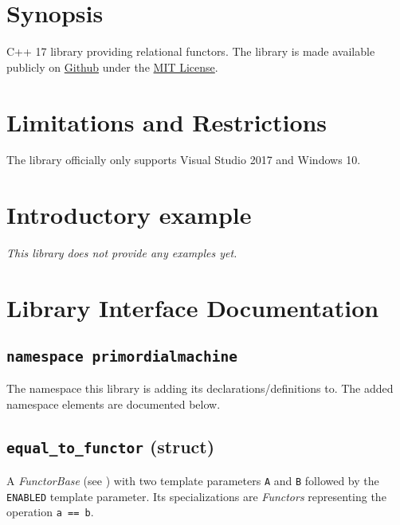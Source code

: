 \documentclass[oneside]{book}
\begin{document}
\frontmatter

\begin{titlepage}
\maketitle
\end{titlepage}

\tableofcontents
{}

\mainmatter

\chapter{Synopsis}
C++ 17 library providing relational functors.
The library is made available publicly on
\href{\GetLibraryRepository}{Github}
under the
\href{\GetLibraryRepository/blob/master/LICENSE}{MIT License}.

\chapter{Limitations and Restrictions}
The library officially only supports Visual Studio 2017 and Windows 10.

\chapter{Introductory example}
\textit{\color{orange}This library does not provide any examples yet.}



\chapter{Library Interface Documentation}

\section{\texttt{namespace primordialmachine}}
The namespace this library is adding its declarations/definitions to.
The added namespace elements are documented below.

\section{\texttt{equal\_to\_functor} (struct)}
A \textit{FunctorBase} (see \cite{functors}) with two template parameters \texttt{A} and \texttt{B} followed by the \texttt{ENABLED} template parameter.
Its specializations are \textit{Functors} representing the operation \texttt{a == b}.
\end{document}
